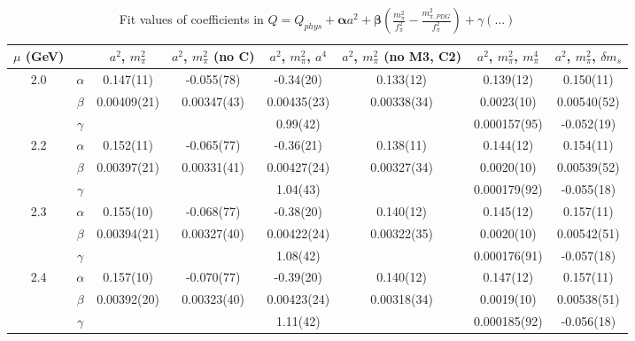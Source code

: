 \documentclass[12pt]{extarticle}
\begin{document}
\begin{table}[h!]
\begin{center}
\begin{tabular}{|c c|c|c|c|c|c|c|}
\hline
$\mu$ (GeV) &  & $a^2$, $m_\pi^2$& $a^2$, $m_\pi^2$ (no C)& $a^2$, $m_\pi^2$, $a^4$& $a^2$, $m_\pi^2$ (no M3, C2)& $a^2$, $m_\pi^2$, $m_\pi^4$& $a^2$, $m_\pi^2$, $\delta m_s$\\
\hline
\multirow{3}{0.5in}{2.0} & $\alpha$ & 0.147(11)& -0.055(78)& -0.34(20)& 0.133(12)& 0.139(12)& 0.150(11)\\
 & $\beta$ & 0.00409(21)& 0.00347(43)& 0.00435(23)& 0.00338(34)& 0.0023(10)& 0.00540(52)\\
 & $\gamma$ &  &  & 0.99(42)&  & 0.000157(95)& -0.052(19)\\
\hline
\multirow{3}{0.5in}{2.2} & $\alpha$ & 0.152(11)& -0.065(77)& -0.36(21)& 0.138(11)& 0.144(12)& 0.154(11)\\
 & $\beta$ & 0.00397(21)& 0.00331(41)& 0.00427(24)& 0.00327(34)& 0.0020(10)& 0.00539(52)\\
 & $\gamma$ &  &  & 1.04(43)&  & 0.000179(92)& -0.055(18)\\
\hline
\multirow{3}{0.5in}{2.3} & $\alpha$ & 0.155(10)& -0.068(77)& -0.38(20)& 0.140(12)& 0.145(12)& 0.157(11)\\
 & $\beta$ & 0.00394(21)& 0.00327(40)& 0.00422(24)& 0.00322(35)& 0.0020(10)& 0.00542(51)\\
 & $\gamma$ &  &  & 1.08(42)&  & 0.000176(91)& -0.057(18)\\
\hline
\multirow{3}{0.5in}{2.4} & $\alpha$ & 0.157(10)& -0.070(77)& -0.39(20)& 0.140(12)& 0.147(12)& 0.157(11)\\
 & $\beta$ & 0.00392(20)& 0.00323(40)& 0.00423(24)& 0.00318(34)& 0.0019(10)& 0.00538(51)\\
 & $\gamma$ &  &  & 1.11(42)&  & 0.000185(92)& -0.056(18)\\
\hline
\end{tabular}
\caption{Fit values of coefficients in $Q = Q_{phys} + \mathbf{\alpha} a^2 + \mathbf{\beta}\left(\frac{m_\pi^2}{f_\pi^2}-\frac{m_{\pi,PDG}^2}{f_\pi^2}\right) + \gamma(\ldots)$}
\end{center}
\end{table}






\end{document}
